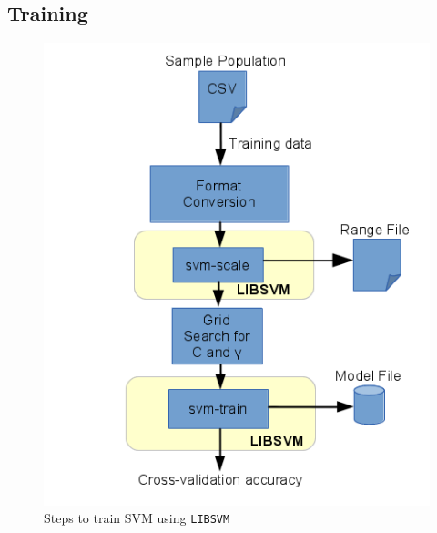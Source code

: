 \subsection{Training}

\begin{figure}[h]
  \begin{center}
    \captionsetup{justification=centering}
    \includegraphics[scale=0.75]{figures/libsvmtrain.png}
    \caption{Steps to train SVM using \texttt{LIBSVM}}
    \label{fig:libsvmtrain}
  \end{center}
\end{figure}

